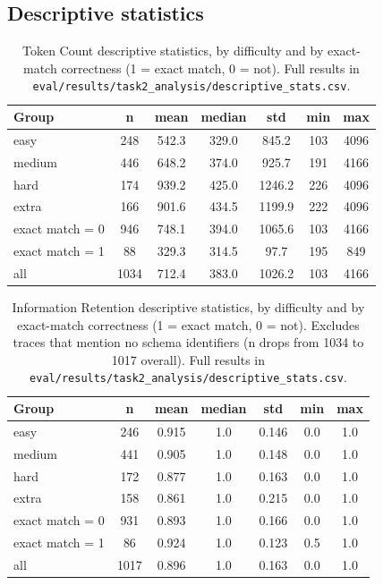 \subsection{Descriptive statistics}
\label{sec:rq2-descriptive-stats}

\begin{table}[H]
\centering
\footnotesize
\caption{Token Count descriptive statistics, by difficulty and by exact-match correctness (1 = exact match, 0 = not). Full results in \texttt{eval/results/task2\_analysis/descriptive\_stats.csv}.}
\label{tab:rq2-descriptive-stats-tokencount}
\begin{tabular}{lcccccc}
\toprule
Group & n & mean & median & std & min & max \\
\midrule
easy & 248 & 542.3 & 329.0 & 845.2 & 103 & 4096 \\
medium & 446 & 648.2 & 374.0 & 925.7 & 191 & 4166 \\
hard & 174 & 939.2 & 425.0 & 1246.2 & 226 & 4096 \\
extra & 166 & 901.6 & 434.5 & 1199.9 & 222 & 4096 \\
\midrule
exact match = 0 & 946 & 748.1 & 394.0 & 1065.6 & 103 & 4166 \\
exact match = 1 & 88 & 329.3 & 314.5 & 97.7 & 195 & 849 \\
\midrule
all & 1034 & 712.4 & 383.0 & 1026.2 & 103 & 4166 \\
\bottomrule
\end{tabular}
\end{table}

\begin{table}[H]
\centering
\footnotesize
\caption{Information Retention descriptive statistics, by difficulty and by exact-match correctness (1 = exact match, 0 = not). Excludes traces that mention no schema identifiers (n drops from 1034 to 1017 overall). Full results in \texttt{eval/results/task2\_analysis/descriptive\_stats.csv}.}
\label{tab:rq2-descriptive-stats-retention}
\begin{tabular}{lcccccc}
\toprule
Group & n & mean & median & std & min & max \\
\midrule
easy & 246 & 0.915 & 1.0 & 0.146 & 0.0 & 1.0 \\
medium & 441 & 0.905 & 1.0 & 0.148 & 0.0 & 1.0 \\
hard & 172 & 0.877 & 1.0 & 0.163 & 0.0 & 1.0 \\
extra & 158 & 0.861 & 1.0 & 0.215 & 0.0 & 1.0 \\
\midrule
exact match = 0 & 931 & 0.893 & 1.0 & 0.166 & 0.0 & 1.0 \\
exact match = 1 & 86 & 0.924 & 1.0 & 0.123 & 0.5 & 1.0 \\
\midrule
all & 1017 & 0.896 & 1.0 & 0.163 & 0.0 & 1.0 \\
\bottomrule
\end{tabular}
\end{table}

